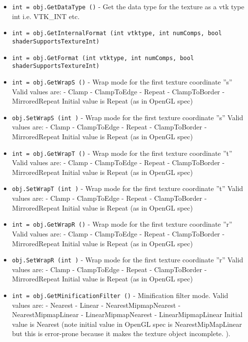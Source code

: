 \begin{itemize}
\item  \verb|int = obj.GetDataType ()| -  Get the data type for the texture as a vtk type int i.e. VTK\_INT etc.

\item  \verb|int = obj.GetInternalFormat (int vtktype, int numComps, bool shaderSupportsTextureInt)|

\item  \verb|int = obj.GetFormat (int vtktype, int numComps, bool shaderSupportsTextureInt)|

\item  \verb|int = obj.GetWrapS ()| -  Wrap mode for the first texture coordinate ''s''
 Valid values are:
 - Clamp
 - ClampToEdge
 - Repeat
 - ClampToBorder
 - MirroredRepeat
 Initial value is Repeat (as in OpenGL spec)

\item  \verb|obj.SetWrapS (int )| -  Wrap mode for the first texture coordinate ''s''
 Valid values are:
 - Clamp
 - ClampToEdge
 - Repeat
 - ClampToBorder
 - MirroredRepeat
 Initial value is Repeat (as in OpenGL spec)

\item  \verb|int = obj.GetWrapT ()| -  Wrap mode for the first texture coordinate ''t''
 Valid values are:
 - Clamp
 - ClampToEdge
 - Repeat
 - ClampToBorder
 - MirroredRepeat
 Initial value is Repeat (as in OpenGL spec)

\item  \verb|obj.SetWrapT (int )| -  Wrap mode for the first texture coordinate ''t''
 Valid values are:
 - Clamp
 - ClampToEdge
 - Repeat
 - ClampToBorder
 - MirroredRepeat
 Initial value is Repeat (as in OpenGL spec)

\item  \verb|int = obj.GetWrapR ()| -  Wrap mode for the first texture coordinate ''r''
 Valid values are:
 - Clamp
 - ClampToEdge
 - Repeat
 - ClampToBorder
 - MirroredRepeat
 Initial value is Repeat (as in OpenGL spec)

\item  \verb|obj.SetWrapR (int )| -  Wrap mode for the first texture coordinate ''r''
 Valid values are:
 - Clamp
 - ClampToEdge
 - Repeat
 - ClampToBorder
 - MirroredRepeat
 Initial value is Repeat (as in OpenGL spec)

\item  \verb|int = obj.GetMinificationFilter ()| -  Minification filter mode.
 Valid values are:
 - Nearest
 - Linear
 - NearestMipmapNearest
 - NearestMipmapLinear
 - LinearMipmapNearest
 - LinearMipmapLinear
 Initial value is Nearest (note initial value in OpenGL spec
 is NearestMipMapLinear but this is error-prone because it makes the
 texture object incomplete. ).


\end{itemize}
